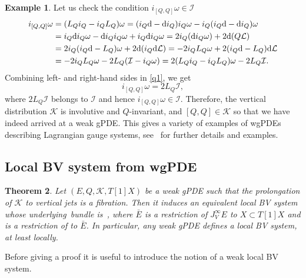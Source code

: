 \documentclass[10pt,a4paper]{amsart}
\numberwithin{equation}{section}
\newtheorem{Theorem}{Theorem}[section]
\theoremstyle{definition}
\newtheorem{Example}[Theorem]{Example}
\renewcommand{\tilde}{\widetilde}
\def\cK{\mathcal{K}}
\newcommand{\vprol}{\tilde}
\begin{document}
\begin{Example}
 Let us check the condition $i_{[Q,Q]}\omega\in \mathcal{I}$
 \begin{align}
 i_{[Q,Q]}\omega&{}=(L_Qi_Q-i_QL_Q)\omega=(i_Q{\rm d}-{\rm d}i_Q)i_Q\omega-i_Q(i_Q{\rm d}-{\rm d}i_Q)\omega\nonumber\\
 &{}=i_Q{\rm d}i_Q\omega-{\rm d}i_Qi_Q\omega+i_Q{\rm d}i_Q\omega=2i_Q({\rm d}i_Q\omega)+2{\rm d}(Q\mathcal{L})\nonumber\\
 &{}=2i_Q(i_Q{\rm d}-L_Q)\omega+2{\rm d}(i_Q{\rm d}\mathcal{L})=-2i_QL_Q\omega+2(i_Q{\rm d}-L_Q){\rm d}\mathcal{L}\nonumber\\
 &{}=-2i_QL_Q\omega-2L_Q(\mathcal{I}-i_Q\omega)=2(L_Qi_Q-i_QL_Q)\omega-2L_Q\mathcal{I}.\label{q1}
 \end{align}
Combining left- and right-hand sides in \eqref{q1}, we get
\begin{equation*}
 i_{[Q,Q]}\omega=2L_Q\mathcal{I} ,
\end{equation*}
where $2L_Q\mathcal{I}$ belongs to $\mathcal{I}$ and hence $i_{[Q,Q]}\omega\in \mathcal{I}$. Therefore, the vertical distribution $\mathcal{K}$ is involutive and $Q$-invariant, and $[Q,Q]\in \mathcal{K}$ so that we have indeed arrived at a weak gPDE. This gives a variety of examples of wgPDEs describing Lagrangian gauge systems, see~\cite{Dneprov:2024cvt, Grigoriev:2022zlq} for further details and examples.
 \end{Example}

\subsection{Local BV system from wgPDE}
\label{sec:thm}

\begin{Theorem}\label{prop:main}
Let $(E,Q,\cK,T[1]X)$ be a weak gPDE such that the prolongation \smash{$\vprol{\cK}$} of $\cK$ to vertical jets  is a fibration. Then it induces an equivalent local BV system whose underlying~bundle is~\smash{$\bar E/\vprol{\cK}_0 \to X$}, where $\bar E$ is a restriction of $J^\infty_VE$ to $X \subset T[1]X$
and \smash{$\vprol{\cK}_0$} is a restriction of \smash{$\vprol{\cK}$} to $\bar E$. In particular, any weak gPDE defines a local BV system, at least locally.
\end{Theorem}
Before giving a proof it is useful to introduce the notion of a weak local BV system.
\end{document}
